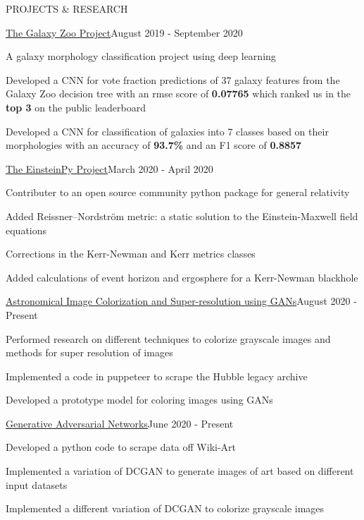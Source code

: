 \documentclass{resume} %
\begin{document}
\begin{rSection}{PROJECTS \& RESEARCH}

\begin{rSubsection}{\href{https://github.com/obi-wan-shinobi/Galaxy_Zoo}{The Galaxy Zoo Project}}{August 2019 - September 2020}{}{}
\item A galaxy morphology classification project using deep learning
\item Developed a CNN for vote fraction predictions of 37 galaxy features from the Galaxy Zoo decision tree with an rmse score of \textbf{0.07765} which ranked us in the \textbf{top 3} on the public leaderboard
\item Developed a CNN for classification of galaxies into 7 classes based on their morphologies with an accuracy of \textbf{93.7\%} and an F1 score of \textbf{0.8857}
\end{rSubsection}

\begin{rSubsection}{\href{https://github.com/obi-wan-shinobi/einsteinpy}{The EinsteinPy Project}}{March 2020 - April 2020}{}{}
\item Contributer to an open source community python package for general relativity
\item Added Reissner–Nordström metric: a static solution to the Einstein-Maxwell field equations
\item Corrections in the Kerr-Newman and Kerr metrics classes
\item Added calculations of event horizon and ergosphere for a Kerr-Newman blackhole
\end{rSubsection}

\begin{rSubsection}{\href{https://github.com/users/obi-wan-shinobi/projects/1}{Astronomical Image Colorization and Super-resolution using GANs}}{August 2020 - Present}{}{}
\item Performed research on different techniques to colorize grayscale images and methods for super resolution of images
\item Implemented a code in puppeteer to scrape the Hubble legacy archive
\item Developed a prototype model for coloring images using GANs
\end{rSubsection}

\begin{rSubsection}{\href{https://github.com/obi-wan-shinobi/Modern-Art}{Generative Adversarial Networks}}{June 2020 - Present}{}{}
\item Developed a python code to scrape data off Wiki-Art
\item Implemented a variation of DCGAN to generate images of art based on different input datasets
\item Implemented a different variation of DCGAN to colorize grayscale  images
\end{rSubsection}


\end{rSection}
\end{document}
